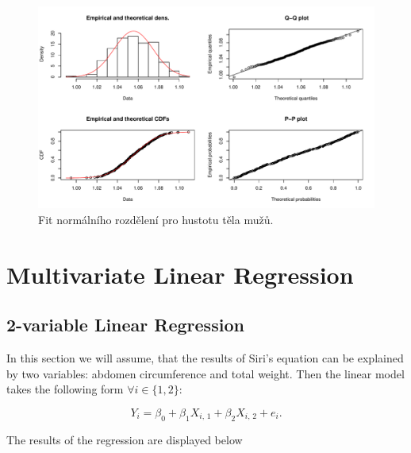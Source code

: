 \documentclass[11pt,american,czech]{article}
\begin{document}
\begin{figure}[ht!]
	\centering
	\includegraphics[width=1.0\linewidth]{Images/FIGURES/density_fitdist}
	\caption{Fit normálního rozdělení pro hustotu těla mužů.}
	\label{fig:density_fitdist}
\end{figure}

\newpage

\section{Multivariate Linear Regression}

\subsection{2-variable Linear Regression}

In this section we will assume, that the results of Siri's equation can be explained by two variables: abdomen circumference and total weight. Then the linear model takes the following form $\forall i \in \{1,2\}$:

\begin{equation}
	Y_{i} = \beta_{0} + \beta_{1} X_{i,\,1} + \beta_{2} X_{i,\,2} + e_{i}.
\end{equation}

\medskip

The results of the regression are displayed below

%
%
%
%
\end{document}
